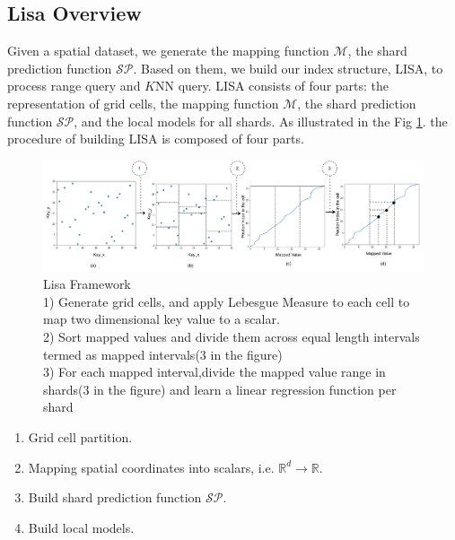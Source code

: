 \subsection{Lisa Overview}


Given a spatial dataset, we generate the mapping function $\mathcal{M}$, the shard prediction function $\mathcal{SP}$. Based on them, we build our index structure, LISA, to process range query and $K$NN query. LISA consists of four parts: the representation of grid cells, the mapping function $\mathcal{M}$, the shard prediction function $\mathcal{SP}$, and the local models for all shards. As illustrated in the Fig \ref{fig:Lisa_Framework}. the procedure of building LISA is composed of four parts.

\begin{figure}[t]
    \centering
\includegraphics[width=1\textwidth]{graphs/implementation/lisa_overview.pdf}
    \caption{Lisa Framework\\
     1) Generate grid cells, and apply Lebesgue Measure to each cell to map two dimensional key value to a scalar.\\
    2) Sort mapped values and divide them across equal length intervals termed as mapped intervals(3 in the figure)\\
    3) For each mapped interval,divide the mapped value range in shards(3 in the figure) and learn a linear regression function per shard }
    \label{fig:Lisa_Framework}
\end{figure}

\begin{enumerate}
	\item Grid cell partition.
	\item Mapping spatial coordinates into scalars, i.e. $\mathbb{R}^d\to\mathbb{R}$.
	\item Build shard prediction function $\mathcal{SP}$.
	\item Build local models.
\end{enumerate}

